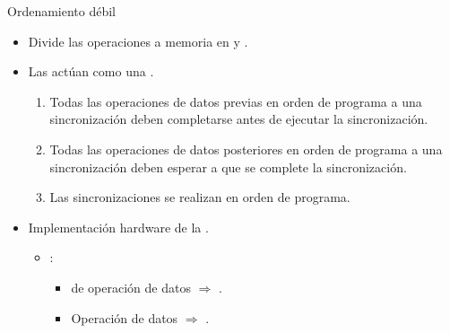 \begin{frame}[t]{Ordenamiento débil}
\begin{itemize}
  \item Divide las operaciones a memoria en  
        y .

  \item Las  actúan como una .
    \begin{enumerate}
      \item Todas las operaciones de datos previas en orden de programa a una sincronización 
            deben completarse antes de ejecutar la sincronización.
      \item Todas las operaciones de datos posteriores en orden de programa a una sincronización 
            deben esperar a que se complete la sincronización.
      \item Las sincronizaciones se realizan en orden de programa.
    \end{enumerate}

  \item Implementación hardware de la .
    \begin{itemize}
      \item {}:
        \begin{itemize}
          \item {} de operación de datos $\Rightarrow$ .
          \item Operación de datos  $\Rightarrow$ .
        \end{itemize}
    \end{itemize}
\end{itemize}
\end{frame}

